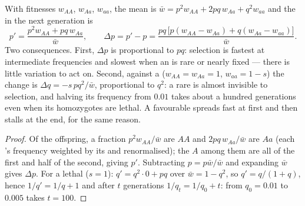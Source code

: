 \begin{theorem}\label{thm:b2:population-genetics:selection}
With  fitnesses $w_{AA}$, $w_{Aa}$, $w_{aa}$, the mean
 is $\bar w = p^{2}w_{AA} + 2pq\,w_{Aa} + q^{2}w_{aa}$ and the
 in the next generation is
\[
p' = \frac{p^{2}w_{AA} + pq\,w_{Aa}}{\bar w}, \qquad
\Delta p = p' - p = \frac{pq\,\bigl[p(w_{AA} - w_{Aa}) + q(w_{Aa} - w_{aa})\bigr]}{\bar w}.
\]
Two consequences. First, $\Delta p$ is proportional to $pq$: selection
is fastest at intermediate frequencies and slowest when an  is
rare or nearly fixed --- there is little variation to act on.
Second, against a   ($w_{AA} = w_{Aa} = 1$, $w_{aa} =
1 - s$) the change is $\Delta q = -s\,pq^{2}/\bar w$, proportional
to $q^{2}$: a rare  is almost invisible to selection, and
halving its frequency from $0.01$ takes about a hundred generations
even when its homozygotes are lethal. A favourable  
spreads fast at first and then stalls at the end, for the same
reason.
\end{theorem}
\begin{proof}
Of the offspring, a fraction $p^{2}w_{AA}/\bar w$ are $AA$ and
$2pq\,w_{Aa}/\bar w$ are $Aa$ (each 's frequency weighted by
its  and renormalised); the $A$  among them are all of
the first and half of the second, giving $p'$. Subtracting $p =
p\bar w/\bar w$ and expanding $\bar w$ gives $\Delta p$. For a lethal
 ($s = 1$): $q' = q^{2}\cdot 0 + pq$ over $\bar w = 1 -
q^{2}$, so $q' = q/(1 + q)$, hence $1/q' = 1/q + 1$ and after $t$
generations $1/q_t = 1/q_0 + t$: from $q_0 = 0.01$ to $0.005$ takes
$t = 100$.
\end{proof}

